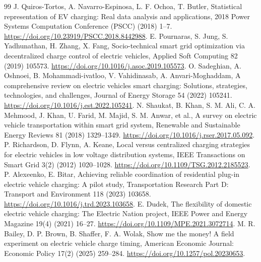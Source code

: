 \documentclass[12pt]{article}
\begin{document}
\begin{thebibliography}{99}
 J. Quiros-Tortos, A. Navarro-Espinosa, L. F. Ochoa, T. Butler, Statistical representation of EV charging: Real data analysis and applications, 2018 Power Systems Computation Conference (PSCC) (2018) 1--7. \url{https://doi.org/10.23919/PSCC.2018.8442988}.
 E. Pournaras, S. Jung, S. Yadhunathan, H. Zhang, X. Fang, Socio-technical smart grid optimization via decentralized charge control of electric vehicles, Applied Soft Computing 82 (2019) 105573. \url{https://doi.org/10.1016/j.asoc.2019.105573}.
 O. Sadeghian, A. Oshnoei, B. Mohammadi-ivatloo, V. Vahidinasab, A. Anvari-Moghaddam, A comprehensive review on electric vehicles smart charging: Solutions, strategies, technologies, and challenges, Journal of Energy Storage 54 (2022) 105241. \url{https://doi.org/10.1016/j.est.2022.105241}.
 N. Shaukat, B. Khan, S. M. Ali, C. A. Mehmood, J. Khan, U. Farid, M. Majid, S. M. Anwar, et al., A survey on electric vehicle transportation within smart grid system, Renewable and Sustainable Energy Reviews 81 (2018) 1329--1349. \url{https://doi.org/10.1016/j.rser.2017.05.092}.
 P. Richardson, D. Flynn, A. Keane, Local versus centralized charging strategies for electric vehicles in low voltage distribution systems, IEEE Transactions on Smart Grid 3(2) (2012) 1020--1028. \url{https://doi.org/10.1109/TSG.2012.2185523}.
 P. Alexeenko, E. Bitar, Achieving reliable coordination of residential plug-in electric vehicle charging: A pilot study, Transportation Research Part D: Transport and Environment 118 (2023) 103658. \url{https://doi.org/10.1016/j.trd.2023.103658}.
 E. Dudek, The flexibility of domestic electric vehicle charging: The Electric Nation project, IEEE Power and Energy Magazine 19(4) (2021) 16--27. \url{https://doi.org/10.1109/MPE.2021.3072714}.
 M. R. Bailey, D. P. Brown, B. Shaffer, F. A. Wolak, Show me the money! A field experiment on electric vehicle charge timing, American Economic Journal: Economic Policy 17(2) (2025) 259--284. \url{https://doi.org/10.1257/pol.20230653}.


\end{thebibliography}
\end{document}
